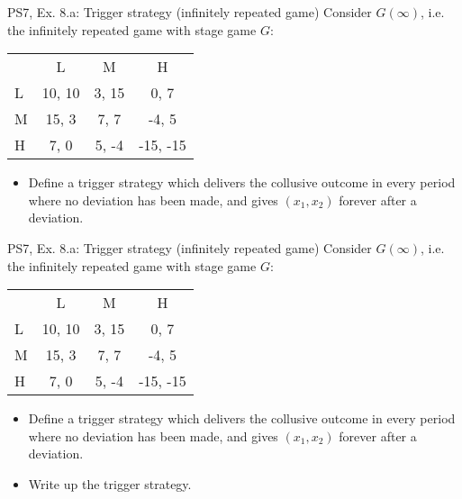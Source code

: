 \begin{frame}{PS7, Ex. 8.a: Trigger strategy (infinitely repeated game)}
    Consider $G(\infty)$, i.e. the infinitely repeated game with stage game $G$: \vspace{-6pt}
    \begin{table}
      \begin{tabular}{l|c|c|c|}
        \multicolumn{1}{c}{} & \multicolumn{1}{c}{L} & \multicolumn{1}{c}{M} & \multicolumn{1}{c}{H} \\\cline{2-4}
        L & 10, 10 & 3, 15 & 0, 7 \\\cline{2-4}
        M & 15, 3 & 7, 7 & -4, 5 \\\cline{2-4}
        H & 7, 0 & 5, -4 & -15, -15 \\\cline{2-4}
      \end{tabular}
    \end{table}
    \begin{itemize}
      \item[(a)] Define a trigger strategy which delivers the collusive outcome in every period where no deviation has been made, and gives $(x_1, x_2)$ forever after a deviation.
    \end{itemize}
    \vfill\null
\end{frame}
\begin{frame}{PS7, Ex. 8.a: Trigger strategy (infinitely repeated game)}
    Consider $G(\infty)$, i.e. the infinitely repeated game with stage game $G$: \vspace{-6pt}
    \begin{table}
      \begin{tabular}{l|c|c|c|}
        \multicolumn{1}{c}{} & \multicolumn{1}{c}{L} & \multicolumn{1}{c}{M} & \multicolumn{1}{c}{H} \\\cline{2-4}
        L & 10, 10 & 3, 15 & 0, 7 \\\cline{2-4}
        M & 15, 3 & 7, 7 & -4, 5 \\\cline{2-4}
        H & 7, 0 & 5, -4 & -15, -15 \\\cline{2-4}
      \end{tabular}
    \end{table}
    \begin{itemize}
      \item[(a)] Define a trigger strategy which delivers the collusive outcome in every period where no deviation has been made, and gives $(x_1, x_2)$ forever after a deviation.
    \end{itemize}
  \begin{multicols}{2}
    \begin{itemize}
      \item[(Step a)] Write up the trigger strategy.
    \end{itemize}
    \vfill\null\columnbreak
    \vfill\null
  \end{multicols}
\end{frame}

